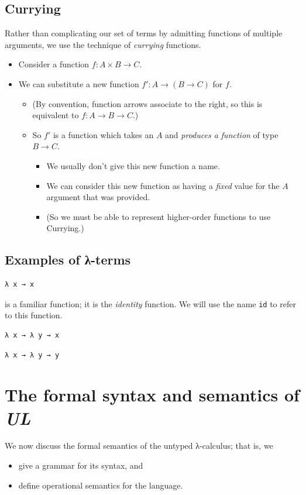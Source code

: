 \documentclass[11pt]{article}
\theoremstyle{definition}
\begin{document}
\subsection{Currying}
\label{sec:org369004c}
Rather than complicating our set of terms by admitting
functions of multiple arguments, we use the technique
of \emph{currying} functions.
\begin{itemize}
\item Consider a function \(f : A × B → C\).
\item We can substitute a new function \(f′ : A → (B → C)\)
for \(f\).
\begin{itemize}
\item (By convention, function arrows associate to the right,
so this is equivalent to \(f : A → B → C\).)
\item So \(f′\) is a function which takes an \(A\) and
\emph{produces a function} of type \(B → C\).
\begin{itemize}
\item We usually don't give this new function a name.
\item We can consider this new function as having a \emph{fixed} value
for the \(A\) argument that was provided.
\item (So we must be able to represent higher-order functions
to use Currying.)
\end{itemize}
\end{itemize}
\end{itemize}

\subsection{Examples of λ-terms}
\label{sec:orgad9d208}
\begin{verbatim}
λ x → x
\end{verbatim}
is a familiar function; it is the \emph{identity} function.
We will use the name \texttt{id} to refer to this function.

\begin{verbatim}
λ x → λ y → x
\end{verbatim}

\begin{verbatim}
λ x → λ y → y
\end{verbatim}

\section{The formal syntax and semantics of \emph{UL}}
\label{sec:org3865f2d}
We now discuss the formal semantics of the untyped λ-calculus;
that is, we
\begin{itemize}
\item give a grammar for its syntax, and
\item define operational semantics for the language.
\end{itemize}
\end{document}
